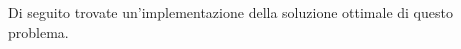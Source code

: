 \begin{comment}
Nella coda \texttt{nuovi\_nodi} al tempo $0$ inseriamo il nodo $0$. Per $t$ che va da $0$ a $T_{max}$:
\begin{itemize}
	\item Per ogni nodo presente in $\texttt{nuovi\_nodi[}t\texttt{]}$ guardo gli archi comparsi prima del tempo $t$ che escono da esso, che si trovano in \texttt{Grafo}. Sia $x$ il nuovo nodo, $y$ quello a cui è connesso dall'arco considerato. Possono verificarsi tre condizioni:
	\begin{enumerate}
		\item la scala $(x, y)$ è scomparsa strettamente prima del tempo $t+1$: la scala non è utilizzabile;
		\item la scala $(x, y)$ è inutile in quanto anche $y$ è raggiungibile entro il tempo $t$;
		\item la scala $(x, y)$ può essere percorsa: allora il nodo $y$ può essere raggiunto esattamente al tempo $t+1$.
	\end{enumerate}
	\item Per ogni arco che compare al tempo $t$, chiamiamo $x$ e $y$ le due sale che collega; possono verificarsi tre condizioni:
	\begin{enumerate}
		\item la scala $(x, y)$ è inutile perché sia $x$ sia $y$ sono raggiungibili entro il tempo $t$;
		\item la scala $(x, y)$ è utile e utilizzabile in quanto esattamente uno tra $x$ e $y$ è raggiungibile entro il tempo $t$, quindi l'altro tra $x$ e $y$ diventa raggiungibile per la prima volta esattamente al tempo $t+1$;
		\item la scala $(x, y)$ \emph{al momento} non è utilizzabile perché al tempo $t$ né $x$ né $y$ sono raggiungibili; in tal caso aggiungiamo la scala a \texttt{Grafo} in modo che se in futuro uno tra $x$ e $y$ diventerà raggiungibile, ci ricorderemo dell'esistenza di quella scala.
	\end{enumerate}
\end{itemize}

Durante tutto questo, se il nodo $N-1$ diventa raggiungibile possiamo direttamente uscire dalla funzione perché abbiamo la risposta al problema; invece se arriviamo al tempo $T_{max}$ senza aver raggiunto il nodo $N-1$ vuol dire che la funzione dovrà ritornare il valore $-1$. L'algoritmo che abbiamo presentato ha complessità computazionale $O(M + T_{max})$.
\end{comment}


\newpage
\CppSolution
Di seguito trovate un'implementazione della soluzione ottimale di questo problema.

%
\colorbox{white}{}

\afterpage{\nopagecolor}

